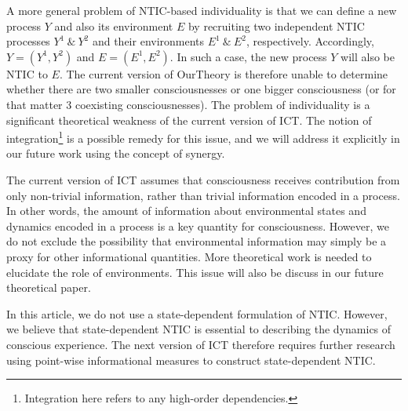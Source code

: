 \documentclass[utf8]{article}
\begin{document}
        A more general problem of NTIC-based individuality is that
        we can define a new process $Y$ and also its environment $E$ by recruiting two independent NTIC processes $Y^1~\&~Y^2$ and their environments $E^1~\&~E^2$, respectively. Accordingly, $Y = (Y^1,Y^2)$ and $E=(E^1,E^2)$. In such a case, the new process $Y$ will also be NTIC to $E$. The current version of \ac{OurTheory} is therefore unable to determine whether there are two smaller consciousnesses or one bigger consciousness (or for that matter 3 coexisting consciousnesses). The problem of individuality is a significant theoretical weakness of the current version of ICT. The notion of integration\footnote{Integration here refers to any high-order dependencies.} is a possible remedy for this issue, and we will address it explicitly in our future work using the concept of synergy.
        
        The current version of ICT assumes that consciousness receives contribution from only non-trivial information, rather than trivial information encoded in a process. In other words, the amount of information about environmental states and dynamics encoded in a process is a key quantity for consciousness. However, we do not exclude the possibility that environmental information may simply be a proxy for other informational quantities. More theoretical work is needed to elucidate the role of environments. This issue will also be discuss in our future theoretical paper.
        
        In this article, we do not use a state-dependent formulation of NTIC. However, we believe that state-dependent NTIC is essential to describing the dynamics of conscious experience. The next version of ICT therefore requires further research using point-wise informational measures to construct state-dependent NTIC.
        
\end{document}
